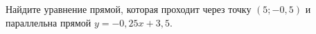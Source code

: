 \begin{ex}
	\begin{condition}
		Найдите уравнение прямой, которая проходит через точку \( (5;-0,5) \) и параллельна прямой \( y=-0,25x+3,5 \).
	\end{condition}
\end{ex}